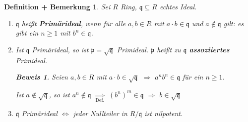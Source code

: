 \documentclass[a4paper,12pt]{scrbook}
\theoremstyle{break}
\newtheorem{DefBem}[Def]{Definition + Bemerkung}
\theoremstyle{nonumberbreak}
\newtheorem{Bew}{Beweis}
\theoremstyle{nonumberplain}
\newcommand{\emp}[1]{\textbf{\emph{#1}}}
\begin{document}
\begin{DefBem}
Sei $R$ Ring, $\mathfrak{q} \subseteq R$ echtes Ideal.

\begin{enumerate}
\item[a)] $\mathfrak{q}$ heißt \emp{Primärideal}, wenn für alle $a,b \in R$ mit $a \cdot b \in \mathfrak{q}$ und $a \notin \mathfrak{q}$ gilt: es gibt ein $n \geq 1$ mit $b^n \in \mathfrak{q}$.

\item[b)] Ist $\mathfrak{q}$ Primärideal, so ist $\mathfrak{p} = \sqrt{\mathfrak{q}}$ Primideal. $\mathfrak{p}$ heißt zu $\mathfrak{q}$ \emp{assoziiertes} Primideal.

\begin{Bew}
Seien $a, b \in R$ mit $a \cdot b \in \sqrt{\mathfrak{q}}$ $\Rightarrow$ $a^n b^n \in \mathfrak{q}$ für ein $n \geq 1$.

Ist $a \notin \sqrt{\mathfrak{q}}$, so ist $a^n \notin \mathfrak{q}$ $\underset{\text{Def.}}{\Rightarrow}$ $(b^n)^m \in \mathfrak{q}$ $\Rightarrow$ $b \in \sqrt{\mathfrak{q}}$
\end{Bew}

\item[c)] $\mathfrak{q}$ Primärideal $\Leftrightarrow$ jeder Nullteiler in $R / \mathfrak{q}$ ist nilpotent.

\end{enumerate}
\end{DefBem}
\end{document}
